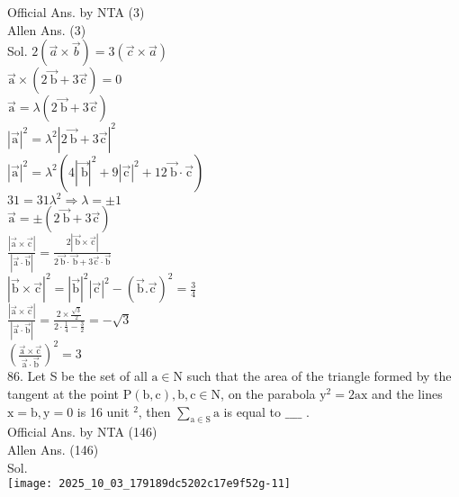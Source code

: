 \documentclass[10pt]{article}
\begin{document}
Official Ans. by NTA (3)\\
Allen Ans. (3)\\
Sol. \(2(\vec{a} \times \vec{b})=3(\vec{c} \times \vec{a})\)\\
\(\overrightarrow{\mathrm{a}} \times(2 \overrightarrow{\mathrm{~b}}+3 \overrightarrow{\mathrm{c}})=0\)\\
\(\overrightarrow{\mathrm{a}}=\lambda(2 \overrightarrow{\mathrm{~b}}+3 \overrightarrow{\mathrm{c}})\)\\
\(|\overrightarrow{\mathrm{a}}|^{2}=\lambda^{2}|2 \overrightarrow{\mathrm{~b}}+3 \overrightarrow{\mathrm{c}}|^{2}\)\\
\(|\overrightarrow{\mathrm{a}}|^{2}=\lambda^{2}\left(4|\overrightarrow{\mathrm{~b}}|^{2}+9|\overrightarrow{\mathrm{c}}|^{2}+12 \overrightarrow{\mathrm{~b}} \cdot \overrightarrow{\mathrm{c}}\right)\)\\
\(31=31 \lambda^{2} \Rightarrow \lambda= \pm 1\)\\
\(\overrightarrow{\mathrm{a}}= \pm(2 \overrightarrow{\mathrm{~b}}+3 \overrightarrow{\mathrm{c}})\)\\
\(\frac{|\overrightarrow{\mathrm{a}} \times \overrightarrow{\mathrm{c}}|}{|\overrightarrow{\mathrm{a}} \cdot \overrightarrow{\mathrm{b}}|}=\frac{2|\overrightarrow{\mathrm{~b}} \times \overrightarrow{\mathrm{c}}|}{2 \overrightarrow{\mathrm{~b}} \cdot \overrightarrow{\mathrm{~b}}+3 \overrightarrow{\mathrm{c}} \cdot \overrightarrow{\mathrm{b}}}\)\\
\(|\overrightarrow{\mathrm{b}} \times \overrightarrow{\mathrm{c}}|^{2}=|\overrightarrow{\mathrm{b}}|^{2}|\overrightarrow{\mathrm{c}}|^{2}-(\overrightarrow{\mathrm{b}} . \overrightarrow{\mathrm{c}})^{2}=\frac{3}{4}\)\\
\(\frac{|\overrightarrow{\mathrm{a}} \times \overrightarrow{\mathrm{c}}|}{|\overrightarrow{\mathrm{a}} \cdot \overrightarrow{\mathrm{b}}|}=\frac{2 \times \frac{\sqrt{3}}{2}}{2 \cdot \frac{1}{4}-\frac{3}{2}}=-\sqrt{3}\)\\
\(\left(\frac{\overrightarrow{\mathrm{a}} \times \overrightarrow{\mathrm{c}}}{\overrightarrow{\mathrm{a}} \cdot \overrightarrow{\mathrm{b}}}\right)^{2}=3\)\\
86. Let S be the set of all \(\mathrm{a} \in \mathrm{N}\) such that the area of the triangle formed by the tangent at the point \(\mathrm{P}(\mathrm{b}, \mathrm{c}), \mathrm{b}, \mathrm{c} \in \mathrm{N}\), on the parabola \(\mathrm{y}^{2}=2 \mathrm{ax}\) and the lines \(\mathrm{x}=\mathrm{b}, \mathrm{y}=0\) is 16 unit \(^{2}\), then \(\sum_{\mathrm{a} \in \mathrm{S}} \mathrm{a}\) is equal to \(\_\_\_\_\) .\\
Official Ans. by NTA (146)\\
Allen Ans. (146)\\
Sol.\\
\texttt{[image: 2025\_10\_03\_179189dc5202c17e9f52g-11]}
\end{document}
